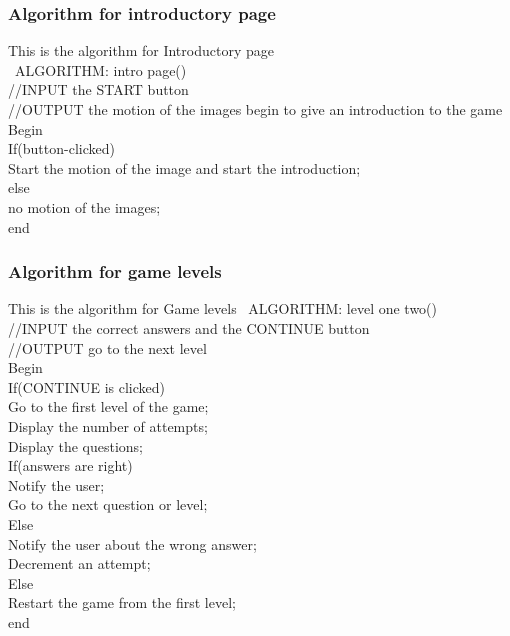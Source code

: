 \subsubsection{Algorithm for introductory page}

 \hspace{1cm}This is the algorithm for Introductory page\\
\rmfamily\ ALGORITHM: intro page()\\
//INPUT the START button\\
//OUTPUT the motion of the images begin to give an introduction to the game\\
Begin\\
If(button-clicked)\\
Start the motion of the image and start the introduction;\\
else\\
no motion of the images;\\
end
\rmfamily
\subsubsection{Algorithm for game levels }
 \hspace{1cm}This is the algorithm for Game levels
\rmfamily\ ALGORITHM: level one two()\\
//INPUT the correct answers and the CONTINUE button\\
//OUTPUT go to the next level\\
Begin\\
If(CONTINUE is clicked)\\
Go to the first level of the game;\\
Display the number of attempts;\\
Display the questions;\\
If(answers are right)\\
Notify the user;\\
Go to the next question or level;\\
Else\\
Notify the user about the wrong answer;\\
Decrement an attempt;\\
Else\\
Restart the game from the first level;\\
end
\rmfamily


